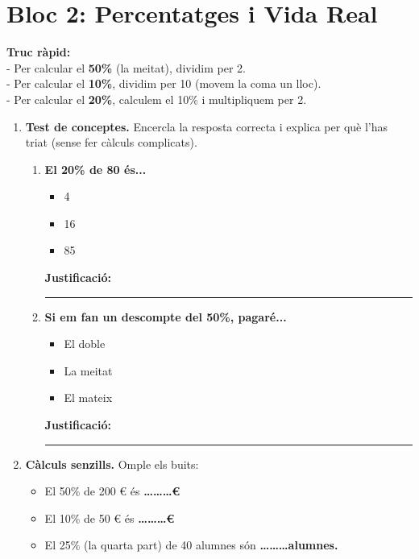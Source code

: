\documentclass[12pt,a4paper]{article}
\newcommand{\formulari}[1]{
    \begin{mdframed}[backgroundcolor=yellow!10, linecolor=orange, innerleftmargin=5pt, innerrightmargin=5pt]
        {\small #1}
    \end{mdframed}
}
\begin{document}
\newpage
\section*{Bloc 2: Percentatges i Vida Real}

\formulari{
    \textbf{Truc ràpid:} \\
    - Per calcular el \textbf{50\%} (la meitat), dividim per 2. \\
    - Per calcular el \textbf{10\%}, dividim per 10 (movem la coma un lloc). \\
    - Per calcular el \textbf{20\%}, calculem el 10\% i multipliquem per 2.
}

\begin{enumerate}[resume]
    \item \textbf{Test de conceptes.} Encercla la resposta correcta i explica per què l'has triat (sense fer càlculs complicats).
    
    \begin{enumerate}
        \item \textbf{El 20\% de 80 és...}
        \begin{itemize}
            \item[a)] 4
            \item[b)] 16
            \item[c)] 85
        \end{itemize}
        \textbf{Justificació:} \rule{10cm}{0.4pt}
        
        \item \textbf{Si em fan un descompte del 50\%, pagaré...}
        \begin{itemize}
            \item[a)] El doble
            \item[b)] La meitat
            \item[c)] El mateix
        \end{itemize}
        \textbf{Justificació:} \rule{10cm}{0.4pt}
    \end{enumerate}

    \item \textbf{Càlculs senzills.} Omple els buits:
    \begin{itemize}
        \item El 50\% de 200 € és \textbf{\dots\dots\dots €}
        \item El 10\% de 50 € és \textbf{\dots\dots\dots €}
        \item El 25\% (la quarta part) de 40 alumnes són \textbf{\dots\dots\dots alumnes.}
    \end{itemize}


\end{enumerate}
\end{document}
